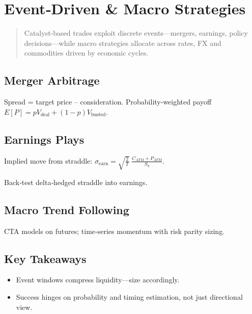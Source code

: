 \chapter{Event‑Driven \& Macro Strategies}\label{ch:eventmacro}

\begin{abstract}
Catalyst‐based trades exploit discrete events—mergers, earnings,
policy decisions—while macro strategies allocate across rates,
FX and commodities driven by economic cycles.
\end{abstract}

\section{Merger Arbitrage}

Spread = target price – consideration.  
Probability‐weighted payoff
\(E[P] = p V_{\text{deal}} + (1-p) V_{\text{busted}}\).

\section{Earnings Plays}

Implied move from straddle: \(\sigma_\text{earn} = \sqrt{\tfrac{2}{T}}\;
          \frac{C_{ATM}+P_{ATM}}{S_0}\).

Back‑test delta‑hedged straddle into earnings.

\section{Macro Trend Following}

CTA models on futures; time‑series momentum with risk parity sizing.

\section*{Key Takeaways}

\begin{itemize}
  \item Event windows compress liquidity—size accordingly.
  \item Success hinges on probability and timing estimation, not just
        directional view.
\end{itemize}
